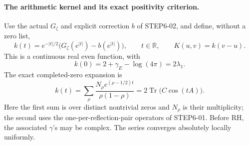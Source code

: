 \documentclass[11pt,a4paper]{article}
\newcommand{\Tr}{\operatorname{Tr}}
\newcommand{\R}{\mathbb R}
\newcommand{\fid}[1]{\textsf{#1}}
\begin{document}
\paragraph{The arithmetic kernel and its exact positivity criterion.}
Use the actual \(G_\zeta\) and explicit correction \(b\) of
\fid{STEP6-02}, and define, without a zero list,
\[
 k(t)=e^{-|t|/2}\bigl(G_\zeta(e^{|t|})-b(e^{|t|})\bigr),
 \qquad t\in\R,\qquad K(u,v)=k(v-u).
\]
This is a continuous real even function, with
\[
 k(0)=2+\gamma_E-\log(4\pi)=2\lambda_1.
\]
The exact completed-zero expansion is
\begin{equation}\label{eq:arithkernelzero}
 k(t)=\sum_\rho
 \frac{N_\rho e^{(\rho-1/2)t}}{\rho(1-\rho)}
 =2\Tr\bigl(C\cos(tA)\bigr).
\end{equation}
Here the first sum is over distinct nontrivial zeros and \(N_\rho\)
is their multiplicity; the second uses the one-per-reflection-pair
operators of \fid{STEP6-01}. Before RH, the associated \(\gamma\)'s
may be complex. The series converges absolutely locally uniformly.
\end{document}
